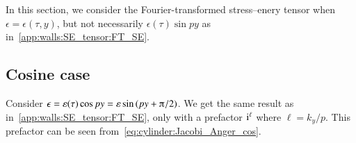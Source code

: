 











In this section, we consider the Fourier-transformed stress--enery tensor when $\epsilon = \epsilon(\tau,y)$, but not necessarily $\epsilon(\tau)\sin{py}$ as in~\cref{app:walls:SE_tensor:FT_SE}.


\subsection{Cosine case}\label{app:walls:SE_tensor_alt:cos}
    Consider $\epsilon=\varepsilon(\tau)\cos{py} = \varepsilon\sin{(py  + \ppi/2 )}$. We get the same result as in~\cref{app:walls:SE_tensor:FT_SE}, only with a prefactor $\mathrm{i}^{\ell}$ where $\ell = k_y/p$. This prefactor can be seen from~\cref{eq:cylinder:Jacobi_Anger_cos}.




